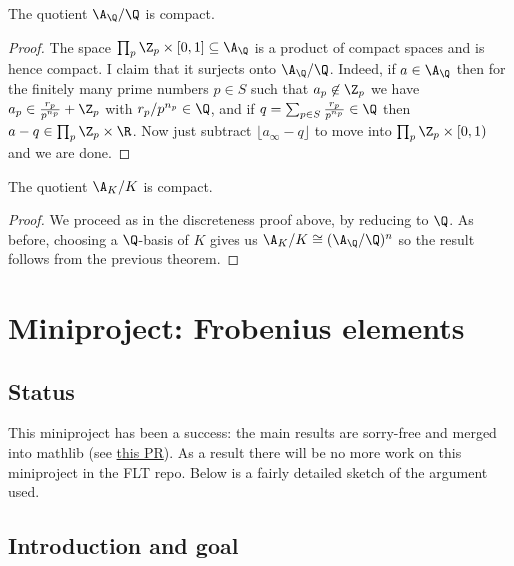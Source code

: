 \begin{theorem}
  \label{Rat.AdeleRing.cocompact}
  \leanok
  The quotient $\A_{\Q}/\Q$ is compact.
\end{theorem}
\begin{proof}
  The space $\prod_p\Z_p\times[0,1]\subseteq\A_{\Q}$ is a product of compact spaces
  and is hence compact. I claim that it surjects onto $\A_{\Q}/\Q$. Indeed,
  if $a\in\A_{\Q}$ then for the finitely many prime numbers $p\in S$ such that $a_p\not\in\Z_p$
  we have $a_p\in\frac{r_p}{p^{n_p}}+\Z_p$ with $r_p/p^{n_p}\in\Q$, and
  if $q=\sum_{p\in S}\frac{r_p}{p^{n_p}}\in\Q$ then $a-q\in \prod_p\Z_p\times\R$.
  Now just subtract $\lfloor a_{\infty}-q\rfloor$ to move into $\prod_p\Z_p\times[0,1)$
  and we are done.
\end{proof}

\begin{theorem}
  \label{NumberField.AdeleRing.cocompact}
  \leanok
  The quotient $\A_K/K$ is compact.
\end{theorem}
\begin{proof}
  We proceed as in the discreteness proof above, by reducing to $\Q$. As before, choosing
  a $\Q$-basis of $K$ gives us $\A_K/K\cong(\A_{\Q}/\Q)^n$ so the result follows from
  the previous theorem.
\end{proof}


\chapter{Miniproject: Frobenius elements}\label{Frobenius_project}

\section{Status}

This miniproject has been a success: the main results
are sorry-free and merged into mathlib
(see \href{https://github.com/leanprover-community/mathlib4/pull/19926}{this PR}).
As a result there will be no more work
on this miniproject in the FLT repo. Below is a fairly
detailed sketch of the argument used.

\section{Introduction and goal}

